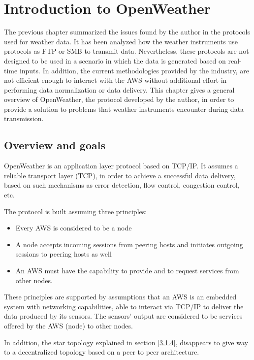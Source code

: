 

\chapter{Introduction to OpenWeather}

The previous chapter summarized the issues found by the author in the protocols used for weather data. It has been analyzed how the weather instruments use protocols as \gls{FTP} or \gls{SMB} to transmit data. Nevertheless, these protocols are not designed to be used in a scenario in which the data is generated based on real-time inputs. In addition, the current methodologies provided by the industry, are not efficient enough to interact with the \gls{AWS} without additional effort in performing data normalization or data delivery. This chapter gives a general overview of OpenWeather, the protocol developed by the author, in order to provide a solution to problems that weather instruments encounter during data transmission.

\section{Overview and goals}\label{5.1}

OpenWeather is an application layer protocol based on \gls{TCP}/\gls{IP}. It assumes a reliable transport layer (\gls{TCP}), in order to achieve a successful data delivery, based on such mechanisms as error detection, flow control, congestion control, etc.

The protocol is built assuming three principles:

\begin{itemize}
\item Every \gls{AWS} is considered to be a node
\item A node accepts incoming sessions from peering hosts and initiates outgoing sessions to peering hosts as well
\item	An \gls{AWS} must have the capability to provide and to request services from other nodes.
\end{itemize}

These principles are supported by assumptions that an \gls{AWS} is an embedded system with networking capabilities, able to interact via TCP/IP to deliver the data produced by its sensors. The sensors' output are considered to be services offered by the \gls{AWS} (node) to other nodes.
 
In addition, the star topology explained in section \ref{3.1.4}, disappears to give way to a decentralized topology based on a peer to peer architecture.


